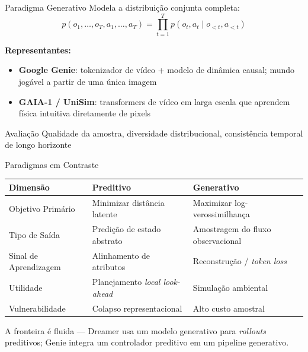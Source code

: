 \documentclass[aspectratio=169]{beamer}
\begin{document}
\begin{frame}{Paradigma Generativo}
  Modela a distribuição conjunta completa:
  \begin{equation}
    p(o_1, \dots, o_T, a_1, \dots, a_T) = \prod_{t=1}^T p(o_t, a_t \mid o_{<t}, a_{<t})
  \end{equation}

  \vspace{0.3em}
  \textbf{Representantes:}
  \begin{itemize}
    \item \textbf{Google Genie}: tokenizador de vídeo + modelo de dinâmica causal; mundo jogável a partir de uma única imagem
    \item \textbf{GAIA-1 / UniSim}: transformers de vídeo em larga escala que aprendem física intuitiva diretamente de pixels
  \end{itemize}

  \vspace{0.5em}
  \begin{block}{Avaliação}
    Qualidade da amostra, diversidade distribucional, consistência temporal de longo horizonte
  \end{block}
\end{frame}

\begin{frame}{Paradigmas em Contraste}
  \centering
  \footnotesize
  \begin{tabular}{lp{4.2cm}p{4.2cm}}
    \toprule
    \textbf{Dimensão} & \textbf{Preditivo} & \textbf{Generativo} \\
    \midrule
    Objetivo Primário & Minimizar distância latente & Maximizar log-verossimilhança \\
    Tipo de Saída & Predição de estado abstrato & Amostragem do fluxo observacional \\
    Sinal de Aprendizagem & Alinhamento de atributos & Reconstrução / \textit{token loss} \\
    Utilidade & Planejamento \textit{local look-ahead} & Simulação ambiental \\
    Vulnerabilidade & Colapso representacional & Alto custo amostral \\
    \bottomrule
  \end{tabular}

  \vspace{0.5em}
  \pause
  \begin{alertblock}{}
    A fronteira é fluida --- Dreamer usa um modelo generativo para \textit{rollouts} preditivos; Genie integra um controlador preditivo em um pipeline generativo.
  \end{alertblock}
\end{frame}
\end{document}
